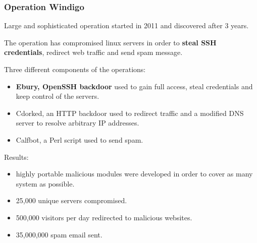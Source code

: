 \begin{frame}
	\frametitle{Operation Windigo}
	
	Large and sophisticated operation started in 2011 and discovered after 3 years.
	
	\smallskip
	
	The operation has compromised linux servers in order to \textbf{steal SSH credentials}, redirect web traffic and send spam message.
	
	\smallskip
	
  Three different components of the operations:
  
  \begin{itemize}
    \item \textbf{Ebury, OpenSSH backdoor} used to gain full access, steal credentials and keep control of the servers.
    \item Cdorked, an HTTP backdoor used to redirect traffic and a modified DNS server to resolve arbitrary IP addresses.
    \item Calfbot, a Perl script used to send spam.
  \end{itemize}	

	\smallskip
	
  Results:
  
  \begin{itemize}
    \item highly portable malicious modules were developed in order to cover as many system as possible.
    \item 25,000 unique servers compromised.
    \item 500,000 visitors per day redirected to malicious websites.
    \item 35,000,000 spam email sent.
  \end{itemize}
\end{frame}

